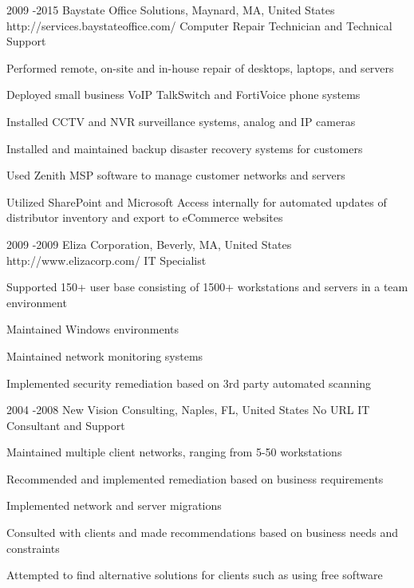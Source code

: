 \documentclass[10pt]{article} %
\begin{document}
\newpage
\job
{2009 -}{2015}
{Baystate Office Solutions, Maynard, MA, United States}
{http://services.baystateoffice.com/}
{Computer Repair Technician and Technical Support}
{\begin{itemize-noindent}
\item{Performed remote, on-site and in-house repair of desktops, laptops, and servers}
\item{Deployed small business VoIP TalkSwitch and FortiVoice phone systems}
\item{Installed CCTV and NVR surveillance systems, analog and IP cameras}
\item{Installed and maintained backup disaster recovery systems for customers}
\item{Used Zenith MSP software to manage customer networks and servers}
\item{Utilized SharePoint and Microsoft Access internally for automated updates of distributor inventory and export to eCommerce websites}
\end{itemize-noindent}}


\job
{2009 -}{2009}
{Eliza Corporation, Beverly, MA, United States}
{http://www.elizacorp.com/}
{IT Specialist}
{\begin{itemize-noindent}
\item{Supported 150+ user base consisting of 1500+ workstations and servers in a team environment}
\item{Maintained Windows environments}
\item{Maintained network monitoring systems}
\item{Implemented security remediation based on 3rd party automated scanning}
\end{itemize-noindent}}


\job
{2004 -}{2008}
{New Vision Consulting, Naples, FL, United States}
{No URL}
{IT Consultant and Support}
{\begin{itemize-noindent}
\item{Maintained multiple client networks, ranging from 5-50 workstations}
\item{Recommended and implemented remediation based on business requirements}
\item{Implemented network and server migrations}
\item{Consulted with clients and made recommendations based on business needs and constraints}
\item{Attempted to find alternative solutions for clients such as using free software}
\end{itemize-noindent}}
\end{document}
